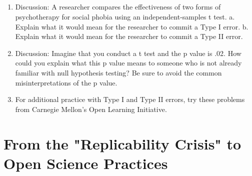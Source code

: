 \subsection{}
\begin{fullwidth}
\begin{enumerate}
\item Discussion: A researcher compares the effectiveness of two forms of psychotherapy for social phobia using an independent-samples t test.
a. Explain what it would mean for the researcher to commit a Type I error.
b. Explain what it would mean for the researcher to commit a Type II error.

\item Discussion: Imagine that you conduct a t test and the p value is .02. How could you explain what this p value means to someone who is not already familiar with null hypothesis testing? Be sure to avoid the common misinterpretations of the p value.

\item For additional practice with Type I and Type II errors, try these problems from Carnegie Mellon's Open Learning Initiative.


\end{enumerate}
\end{fullwidth}  


\section{From the "Replicability Crisis" to Open Science Practices}



